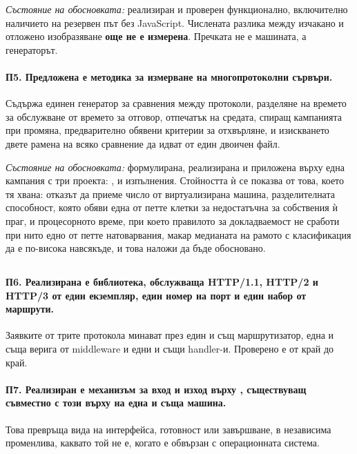 \emph{Състояние на обосновката:} реализиран и проверен функционално, включително наличието на
резервен път без JavaScript. Числената разлика между изчакано и отложено изобразяване
\textbf{още не е измерена}. Пречката не е машината, а генераторът.

\paragraph{П5. Предложена е методика за измерване на многопротоколни сървъри.}
Съдържа единен генератор за сравнения между протоколи, разделяне на времето за обслужване от
времето за отговор, отпечатък на средата, спиращ кампанията при промяна, предварително
обявени критерии за отхвърляне, и изискването двете рамена на всяко сравнение да идват от
един двоичен файл.

\emph{Състояние на обосновката:} формулирана, реализирана и приложена върху една кампания с
три проекта: ,  и 
изпълнения. Стойността ѝ се показва от това, което тя хвана:
отказът да приеме число от виртуализирана машина, разделителната способност, която обяви една
от петте клетки за недостатъчна за собствения ѝ праг, и процесорното време, при което
правилото за докладваемост не сработи при нито едно от петте натоварвания, макар медианата на
рамото с класификация да е по-висока навсякъде, и това наложи да бъде обосновано.

\subsection*{}

\paragraph{П6. Реализирана е библиотека, обслужваща HTTP/1.1, HTTP/2 и HTTP/3 от един
екземпляр, един номер на порт и един набор от маршрути.}
Заявките от трите протокола минават през един и същ маршрутизатор, една и съща верига от
middleware и едни и същи handler-и. Проверено е от край до край.

\paragraph{П7. Реализиран е механизъм за вход и изход върху , съществуващ
съвместно с този върху  на една и съща машина.}
Това превръща вида на интерфейса, готовност или завършване, в независима променлива, каквато
той не е, когато е обвързан с операционната система.

